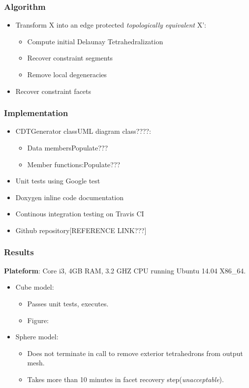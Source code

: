 \documentclass{beamer}
\begin{document}
	\begin{frame}
		\frametitle{Algorithm} 
			\begin{itemize}
				\item Transform X into an edge protected \textit{topologically equivalent} X':	
				\begin{itemize}
					\item Compute initial Delaunay Tetrahedralization	
					\item Recover constraint segments
					\item Remove local degeneracies
				\end{itemize}
				\item Recover constraint facets
			\end{itemize}		
	\end{frame}
	\begin{frame}
		\frametitle{Implementation}
			\begin{itemize}
				\item CDTGenerator class{UML diagram class????}:
					\begin{itemize}
						\item Data members{Populate???}
						\item Member functions:{Populate???}	
					\end{itemize}		
				\item Unit tests using Google test
				\item Doxygen inline code documentation
				\item Continous integration testing on Travis CI	
				\item Github repository[REFERENCE LINK???]	
			\end{itemize}
	\end{frame}	
	\begin{frame}
		\frametitle{Results} 	
		\textbf{Plateform}: Core i3, 4GB RAM, 3.2 GHZ CPU running Ubuntu 14.04 X86\_64.	
			\begin{itemize}
				\item Cube model:
					\begin{itemize}
						\item Passes unit tests, executes.
						\item Figure:
					\end{itemize}
				\item Sphere model:
					\begin{itemize}
						\item Does not terminate in call to remove exterior tetrahedrons from output mesh.
						\item Takes more than 10 minutes in facet recovery step(\textit{unacceptable}).
					\end{itemize}		
			\end{itemize}		
	\end{frame}	
\end{document}
